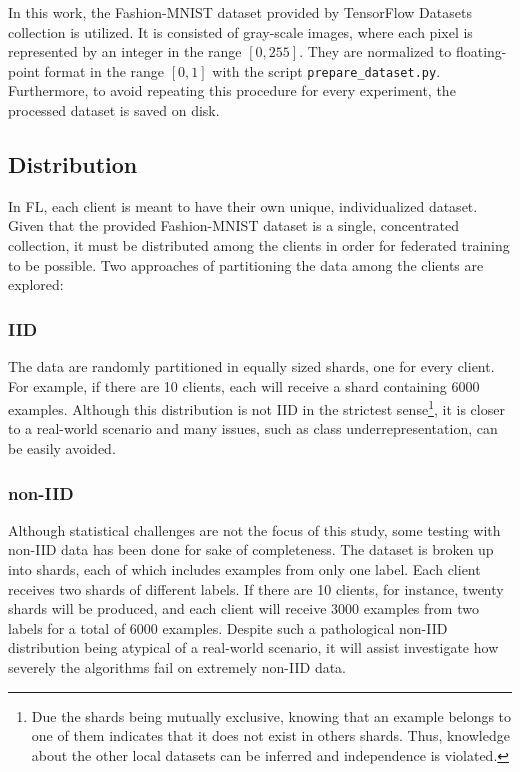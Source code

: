 In this work, the Fashion-MNIST dataset provided by TensorFlow Datasets \cite{TFDS} collection is utilized. It is consisted of gray-scale images, where each pixel is represented by an integer in the range \([0,255]\). They are normalized to floating-point format in the range \([0,1]\) with the script \texttt{prepare\_dataset.py}. Furthermore, to avoid repeating this procedure for every experiment, the processed dataset is saved on disk.

\subsection{Distribution}
In FL, each client is meant to have their own unique, individualized dataset. Given that the provided Fashion-MNIST dataset is a single, concentrated collection, it must be distributed among the clients in order for federated training to be possible. Two approaches of partitioning the data among the clients are explored:

\subsubsection{IID}
The data are randomly partitioned in equally sized shards, one for every client. For example, if there are 10 clients, each will receive a shard containing 6000 examples. Although this distribution is not IID in the strictest sense\footnote{Due the shards being mutually exclusive, knowing that an example belongs to one of them indicates that it does not exist in others shards. Thus, knowledge about the other local datasets can be inferred and independence is violated.}, it is closer to a real-world scenario and many issues, such as class underrepresentation, can be easily avoided.

\subsubsection{non-IID}
Although statistical challenges are not the focus of this study, some testing with non-IID data has been done for sake of completeness. The dataset is broken up into shards, each of which includes examples from only one label. Each client receives two shards of different labels. If there are 10 clients, for instance, twenty shards will be produced, and each client will receive 3000 examples from two labels for a total of 6000 examples. Despite such a pathological non-IID distribution being atypical of a real-world scenario, it will assist investigate how severely the algorithms fail on extremely non-IID data.

